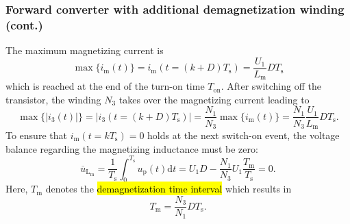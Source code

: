 \begin{frame}
	\frametitle{Forward converter with additional demagnetization winding (cont.)}
	The maximum magnetizing current is
	\begin{equation}
		\max\{i_\mathrm{m}(t)\} = i_\mathrm{m}(t=(k+D)T_\mathrm{s}) = \frac{U_1}{L_\mathrm{m}}DT_\mathrm{s}
	\end{equation}
	which is reached at the end of the turn-on time $T_\mathrm{on}$. \pause After switching off the transistor, the winding $N_3$ takes over the magnetizing current leading to
	\begin{equation}
		\max\{|i_\mathrm{3}(t)|\} = |i_3(t=(k+D)T_\mathrm{s})| = \frac{N_1}{N_3}\max\{i_\mathrm{m}(t)\} = \frac{N_1}{N_3}\frac{U_1}{L_\mathrm{m}}DT_\mathrm{s}.
	\end{equation}\pause
	To ensure that $i_\mathrm{m}(t=kT_\mathrm{s})=0$ holds at the next switch-on event, the voltage balance regarding the magnetizing inductance must be zero:
	\begin{equation}
		\overline{u}_\mathrm{L_\mathrm{m}} = \frac{1}{T_\mathrm{s}}\int_{0}^{T_\mathrm{s}}u_\mathrm{p}(t)\mathrm{d}t = U_1 D - \frac{N_1}{N_3} U_1 \frac{T_\mathrm{m}}{T_\mathrm{s}}  =0 .
	\end{equation}\pause
	Here, $T_\mathrm{m}$ denotes the \hl{demagnetization time interval} which results in
	\begin{equation}
		T_\mathrm{m} = \frac{N_3}{N_1}DT_\mathrm{s}.
		\label{eq:forward_converter_demagnetization_time_interval}
	\end{equation}
\end{frame}

